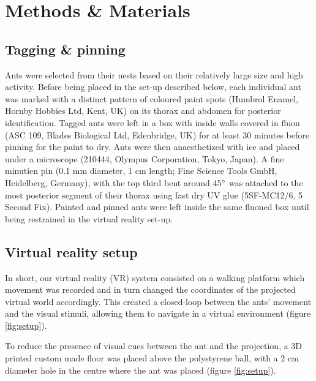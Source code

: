\section{Methods \& Materials} \label{methods}
\subsection{Tagging \& pinning}
Ants were selected from their nests based on their relatively large size and high activity. Before being placed in the set-up described below, each individual ant was marked with a distinct pattern of coloured paint spots (Humbrol Enamel, Hornby Hobbies Ltd, Kent, UK) on its thorax and abdomen for posterior identification. Tagged ants were left in a box with inside walls covered in fluon (ASC 109, Blades Biological Ltd, Edenbridge, UK) for at least 30 minutes before pinning for the paint to dry. Ants were then anaesthetized with ice and placed under a microscope (210444, Olympus Corporation, Tokyo, Japan). A fine minutien pin (0.1 mm diameter, 1 cm length; Fine Science Tools GmbH, Heidelberg, Germany), with the top third bent around 45$\degree$ was attached to the most posterior segment of their thorax using fast dry UV glue (5SF-MC12/6, 5 Second Fix). Painted and pinned ants were left inside the same fluoned box until being restrained in the virtual reality set-up.
\sidenote{\lipsum[1]}
\sidenote{\lipsum[1]}
\sidenote{\lipsum[1]}

\subsection{Virtual reality setup}
In short, our virtual reality (VR) system consisted on a walking platform which movement was recorded and in turn changed the coordinates of the projected virtual world accordingly. This created a closed-loop between the ants’ movement and the visual stimuli, allowing them to navigate in a virtual environment (figure \ref{fig:setup}).

To reduce the presence of visual cues between the ant and the projection, a 3D printed custom made floor was placed above the polystyrene ball, with a 2 cm diameter hole in the centre where the ant was placed (figure \ref{fig:setup}).

